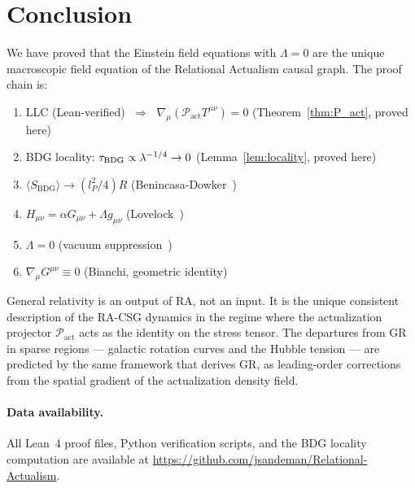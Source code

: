 \documentclass[11pt,a4paper]{article}
\newcommand{\Pact}{\mathcal{P}_{\mathrm{act}}}
\newcommand{\SBDG}{S_{\mathrm{BDG}}}
\begin{document}
\section{Conclusion}
\label{sec:conclusion}

We have proved that the Einstein field equations with $\Lambda = 0$
are the unique macroscopic field equation of the Relational Actualism
causal graph. The proof chain is:
\begin{enumerate}[noitemsep]
  \item LLC (Lean-verified) $\;\Rightarrow\;$
        $\nabla_\mu(\Pact T^{\mu\nu}) = 0$
        (Theorem~\ref{thm:P_act}, proved here)
  \item BDG locality: $\tau_{\rm BDG} \propto \lambda^{-1/4} \to 0$
        (Lemma~\ref{lem:locality}, proved here)
  \item $\langle\SBDG\rangle \to (l_P^2/4)R$
        (Benincasa-Dowker~\citep{Benincasa2010})
  \item $H_{\mu\nu} = \alpha G_{\mu\nu} + \Lambda g_{\mu\nu}$
        (Lovelock~\citep{Lovelock1971})
  \item $\Lambda = 0$ (vacuum suppression~\citep{Sandeman2026RAGC})
  \item $\nabla_\mu G^{\mu\nu} \equiv 0$ (Bianchi, geometric identity)
\end{enumerate}
General relativity is an output of RA, not an input. It is the unique
consistent description of the RA-CSG dynamics in the regime where the
actualization projector $\Pact$ acts as the identity on the stress
tensor. The departures from GR in sparse regions --- galactic rotation
curves and the Hubble tension --- are predicted by the same framework
that derives GR, as leading-order corrections from the spatial
gradient of the actualization density field.

\bigskip
\paragraph{Data availability.}
All Lean~4 proof files, Python verification scripts, and the BDG
locality computation are available at
\url{https://github.com/jsandeman/Relational-Actualism}.
\end{document}
